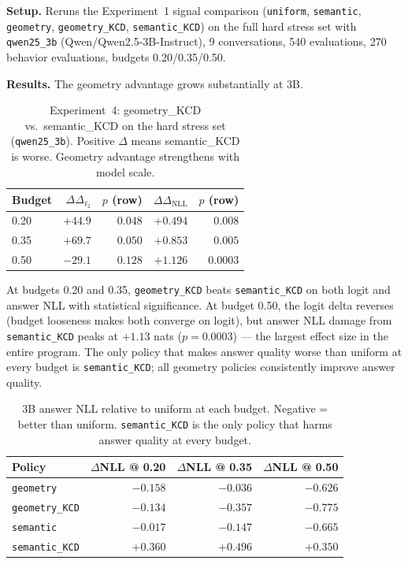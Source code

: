 \documentclass[conference]{IEEEtran}
\newcommand{\Logit}{\Delta_{\ell_2}}
\newcommand{\NLL}{\Delta_{\mathrm{NLL}}}
\begin{document}
\textbf{Setup.} Reruns the Experiment~1 signal comparison (\texttt{uniform}, \texttt{semantic}, \texttt{geometry}, \texttt{geometry\_KCD}, \texttt{semantic\_KCD}) on the full hard stress set with \texttt{qwen25\_3b} (Qwen/Qwen2.5-3B-Instruct), 9 conversations, 540 evaluations, 270 behavior evaluations, budgets 0.20/0.35/0.50.

\textbf{Results.} The geometry advantage grows substantially at 3B.

\begin{table}[t]
    \centering
    \caption{Experiment~4: geometry\_KCD vs.\ semantic\_KCD on the hard stress set (\texttt{qwen25\_3b}). Positive $\Delta$ means semantic\_KCD is worse. Geometry advantage strengthens with model scale.}
    \label{tab:exp4_3b}
    \begin{tabular}{lrrrr}
        \toprule
        Budget & $\Delta\Logit$ & $p$ (row) & $\Delta\NLL$ & $p$ (row) \\
        \midrule
        0.20 & $+44.9$ & $0.048$ & $+0.494$ & $0.008$ \\
        0.35 & $+69.7$ & $0.050$ & $+0.853$ & $0.005$ \\
        0.50 & $-29.1$ & $0.128$ & $+1.126$ & $\mathbf{0.0003}$ \\
        \bottomrule
    \end{tabular}
\end{table}

At budgets 0.20 and 0.35, \texttt{geometry\_KCD} beats \texttt{semantic\_KCD} on both logit and answer NLL with statistical significance. At budget 0.50, the logit delta reverses (budget looseness makes both converge on logit), but answer NLL damage from \texttt{semantic\_KCD} peaks at $+1.13$ nats ($p=0.0003$) --- the largest effect size in the entire program. The only policy that makes answer quality worse than uniform at every budget is \texttt{semantic\_KCD}; all geometry policies consistently improve answer quality.

\begin{table}[t]
    \centering
    \caption{3B answer NLL relative to uniform at each budget. Negative = better than uniform. \texttt{semantic\_KCD} is the only policy that harms answer quality at every budget.}
    \label{tab:exp4_nll}
    \begin{tabular}{lrrr}
        \toprule
        Policy & $\Delta$NLL @ 0.20 & $\Delta$NLL @ 0.35 & $\Delta$NLL @ 0.50 \\
        \midrule
        \texttt{geometry}     & $-0.158$ & $-0.036$ & $-0.626$ \\
        \texttt{geometry\_KCD} & $-0.134$ & $-0.357$ & $-0.775$ \\
        \texttt{semantic}     & $-0.017$ & $-0.147$ & $-0.665$ \\
        \texttt{semantic\_KCD} & $\mathbf{+0.360}$ & $\mathbf{+0.496}$ & $+0.350$ \\
        \bottomrule
    \end{tabular}
\end{table}
\end{document}
